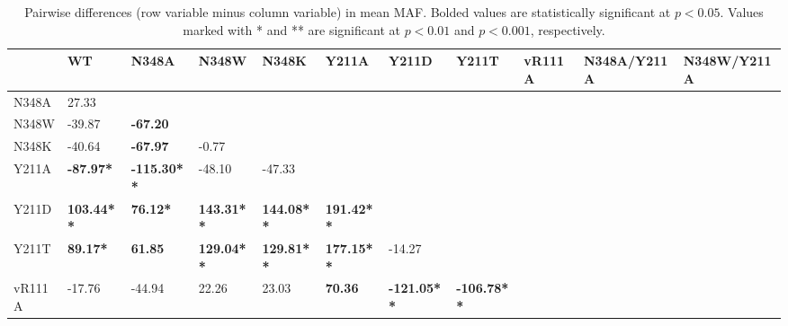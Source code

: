 \documentclass[12pt]{article}
\begin{document}
\clearpage
\begin {table}[H]
\caption{\label{tab:pairwise_differences}Pairwise differences (row variable minus column variable) in mean MAF. Bolded values are statistically significant at $p<0.05$. Values marked with * and ** are significant at $p<0.01$ and $p<0.001$, respectively.}
\begin{center}
  \resizebox{16cm}{!} {
    \begin{tabular}{l l l l l l l l l l l}
    \hline
                & WT                  & N348A              & N348W              & N348K              & Y211A             & Y211D              & Y211T              & vR111A             & N348A/Y211A        & N348W/Y211A        \\ \hline
    N348A       &  27.33              &                    &                    &                    &                   &                    &                    &                    &                    &                    \\
    N348W       & -39.87              & \textbf{-67.20}    &                    &                    &                   &                    &                    &                    &                    &                    \\
    N348K       & -40.64              & \textbf{-67.97}    & -0.77              &                    &                   &                    &                    &                    &                    &                    \\
    Y211A       & \textbf{-87.97*}    & \textbf{-115.30**} & -48.10             & -47.33             &                   &                    &                    &                    &                    &                    \\
    Y211D       & \textbf{103.44**}   & \textbf{76.12*}    & \textbf{143.31**}  & \textbf{144.08**}  & \textbf{191.42**} &                    &                    &                    &                    &                    \\
    Y211T       & \textbf{89.17*}     & \textbf{61.85}     & \textbf{129.04**}  & \textbf{129.81**}  & \textbf{177.15**} & -14.27             &                    &                    &                    &                    \\
   vR111A       & -17.76              & -44.94             & 22.26              & 23.03              & \textbf{70.36}    & \textbf{-121.05**} & \textbf{-106.78**} &                    &                    &                    \\

\end{tabular}}
\end{center}
\end{table}
\end{document}
